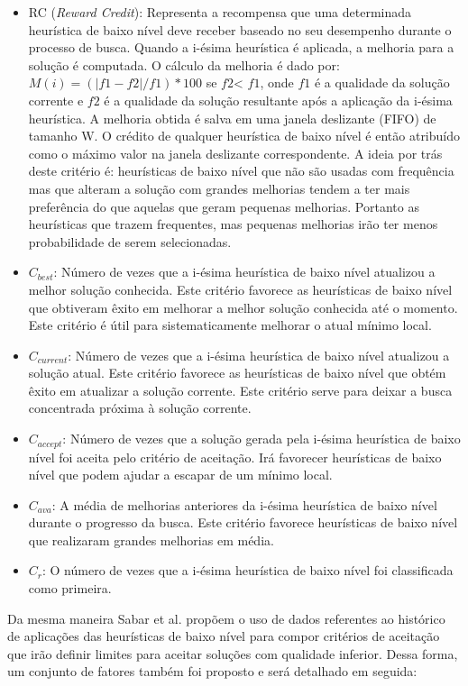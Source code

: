 \begin{itemize}
	\item RC (\textit{Reward Credit}): Representa a recompensa que uma determinada heurística de baixo nível deve receber baseado no seu desempenho durante o processo de busca. Quando a i-ésima heurística é aplicada, a melhoria para a solução é computada. O cálculo da melhoria é dado por: $M(i) = (|f1 -f2|/f1) *100$ se $f2$< $f1$, onde $f1$ é a qualidade da solução corrente e $f2$ é a qualidade da solução resultante após a aplicação da i-ésima heurística. 
	A melhoria obtida é salva em uma janela deslizante (FIFO) de tamanho W. O crédito de qualquer heurística de baixo nível é então atribuído como o máximo valor na janela deslizante correspondente. A ideia por trás deste critério é: heurísticas de baixo nível que não são usadas com frequência mas que alteram a solução com grandes melhorias tendem a ter mais preferência do que aquelas que geram pequenas melhorias. Portanto as heurísticas que trazem frequentes, mas pequenas melhorias irão ter menos probabilidade de serem selecionadas.
	\item $C_{best}$: Número de vezes que a i-ésima heurística de baixo nível atualizou a melhor solução conhecida. Este critério favorece as heurísticas de baixo nível que obtiveram êxito em melhorar a melhor solução conhecida até o momento. Este critério é útil para sistematicamente melhorar o atual mínimo local.
	\item $C_{current}$: Número de vezes que a i-ésima heurística de baixo nível atualizou a solução atual. Este critério favorece as heurísticas de baixo nível que obtém êxito em atualizar a solução corrente. Este critério serve para deixar a busca concentrada próxima à solução corrente.
	\item $C_{accept}$: Número de vezes que a solução gerada pela i-ésima heurística de baixo nível foi aceita pelo critério de aceitação. Irá favorecer heurísticas de baixo nível que podem ajudar a escapar de um mínimo local.
	\item $C_{ava}$: A média de melhorias anteriores da i-ésima heurística de baixo nível durante o progresso da busca. Este critério favorece heurísticas de baixo nível que realizaram grandes melhorias em média.
	\item $C_r$: O número de vezes que a i-ésima heurística de baixo nível foi classificada como primeira.  
\end{itemize} 

Da mesma maneira Sabar et al. propõem o uso de dados referentes ao histórico de aplicações das heurísticas de baixo nível para compor critérios de aceitação que irão definir limites para aceitar soluções com qualidade inferior. Dessa forma, um conjunto de fatores também foi proposto e será detalhado em seguida:


